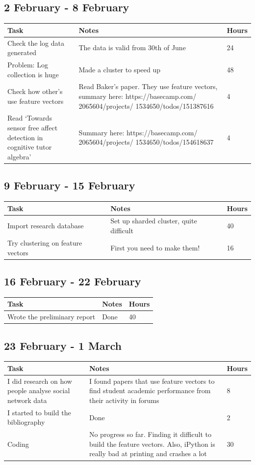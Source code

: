 \documentclass[11pt, oneside]{article}   	%
\begin{document}
\subsection{2 February - 8 February}
\begin{tabularx}{\linewidth}{|X|X|X|}
  \hline
  Task & Notes & Hours \\
  \hline
  Check the log data generated & The data is valid from 30th of June & 24 \\
  \hline
  Problem: Log collection is huge & Made a cluster to speed up & 48\\
  \hline
  Check how other's use feature vectors & Read Baker's paper. They use feature vectors, summary here: https://basecamp.com/ 2065604/projects/ 1534650/todos/151387616 & 4 \\
  \hline
  Read `Towards sensor free affect detection in cognitive tutor algebra' & Summary here: https://basecamp.com/ 2065604/projects/ 1534650/todos/154618637 & 4 \\
  \hline
\end{tabularx}

\subsection{9 February - 15 February}
\begin{tabularx}{\linewidth}{|X|X|X|}
  \hline
  Task & Notes & Hours \\
  \hline
  Import research database & Set up sharded cluster, quite difficult & 40 \\
  \hline
  Try clustering on feature vectors & First you need to make them! & 16 \\
  \hline
\end{tabularx}

\subsection{16 February - 22 February}
\begin{tabularx}{\linewidth}{|X|X|X|}
  \hline
  Task & Notes & Hours \\
  \hline
  Wrote the preliminary report & Done & 40 \\
  \hline
\end{tabularx}

\subsection{23 February - 1 March}
\begin{tabularx}{\linewidth}{|X|X|X|}
  \hline
  Task & Notes & Hours \\
  \hline
  I did research on how people analyse social network data & I found papers that use feature vectors to find student academic performance from their activity in forums & 8 \\
  \hline
  I started to build the bibliography & Done & 2 \\
  \hline
  Coding & No progress so far. Finding it difficult to build the feature vectors. Also, iPython is really bad at printing and crashes a lot & 30 \\
  \hline
\end{tabularx}
\end{document}
